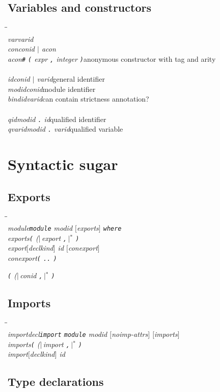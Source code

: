\documentclass[a4paper,dvips]{article}
\newcommand{\tthash}{\#}
\newenvironment{productions}%
  {\begin{tabbing}\hspace{2cm}\=\hspace{6cm}\=\kill{}\\}%
  {\end{tabbing}}
\newcommand{\fixed}[1]{\makebox[3.5em]{#1}}
\newcommand{\production}[3]{\nont{#1}\>\fixed{$\rightarrow$}\nont{#2}\>#3\\}
\newcommand{\next}[2]{\strut{}\>\fixed{$|$}\nont{#1}\>#2\\}
\newcommand{\nont}[1]{\textit{#1}}
\newcommand{\pspace}{\hspace{0.25ex}}
\newcommand{\opt}[1]{$[$#1$]$}
\newcommand{\bananas}[2]{{\rm (}\hspace{-0.5ex}$|\,$#1\pspace$\,|$\hspace{-0.5ex}{\rm )}$^{#2}$}
\newcommand{\sepby}[2]{\bananas{#1 #2}{*}}
\newcommand{\term}[1]{{\tt #1}}
\newcommand{\por}{$|$}
\begin{document}
\subsection{Variables and constructors}

\begin{productions}
\production{var}{varid}{}
\production{con}{conid \por{} acon}{}
\production{acon}{\term{\tthash} \term{(} expr \term{,} integer \term{)}}{anonymous constructor with tag and arity}
\\
\production{id}{conid \por{} varid}{general identifier}
\production{modid}{conid}{module identifier}
\production{bindid}{varid}{can contain strictness annotation?}
\\
\production{qid}{modid \term{.} id}{qualified identifier}
\production{qvarid}{modid \term{.} varid}{qualified variable}
\end{productions}


\section{Syntactic sugar}

\subsection{Exports}

\begin{productions}
\production{module}{\term{module} modid \opt{exports} \term{where}}{}
\production{exports}{\term{(} \sepby{export}{\term{,}} \term{)}}{}
\production{export}{\opt{declkind} id \opt{conexport}}{}
\production{conexport}{\term{(} \term{..} \term{)}}{}
\next{\term{(} \sepby{conid}{\term{,}} \term{)}}{}
\end{productions}


\subsection{Imports}

\begin{productions}
\production{importdecl}{\term{import} \term{module} modid \opt{noimp-attrs} \opt{imports}}{}
\production{imports}{\term{(} \sepby{import}{\term{,}}  \term{)}}{}
\production{import}{\opt{declkind} id}{}
\end{productions}


\subsection{Type declarations}
\end{document}
